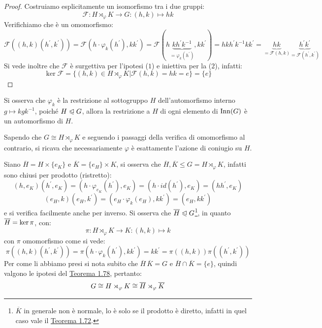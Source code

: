 \documentclass[11pt]{scrartcl}
\begin{document}
\begin{proof}
    Costruiamo esplicitamente un isomorfismo tra i due gruppi:
        \[ \mathcal{F} : H \rtimes_{\varphi} K \longrightarrow G : (h,k) \longmapsto hk
            \]
    Verifichiamo che è un omomorfismo:
        \[
            \mathcal{F}((h,k)(h^{\prime},k^{\prime})) = \mathcal{F}(h\cdot \varphi_k(h^{\prime}),kk^{\prime}) = \mathcal{F}(h\underbrace{kh^{\prime}k^{-1}}_{= \varphi_k(h^{\prime})},kk^{\prime})
            = hkh^{\prime}k^{-1}kk^{\prime} = \underbrace{hk}_{= \mathcal{F}(h,k)}\underbrace{h^{\prime}k^{\prime}}_{= \mathcal{F}(h^{\prime},k^{\prime})}
        \]
    Si vede inoltre che $\mathcal{F}$ è surgettiva per l'ipotesi ($1$) e iniettiva per la ($2$), infatti:
        \[ \ker\mathcal{F} = \{(h,k) \in  H \rtimes_{\varphi} K | \mathcal{F}(h,k) = hk = e\} = \{e\}
            \]
\end{proof}

\begin{remark}
    Si osserva che $\varphi_k$ è la restrizione al sottogruppo $H$ dell'automorfismo interno $g \longmapsto kgk^{-1}$, poiché
    $H \trianglelefteqslant G$, allora la restrizione a $H$ di ogni elemento di $\operatorname{Inn}(G)$ è un automorfismo di $H$.
\end{remark}

\begin{remark}
    Sapendo che $G \cong H \rtimes_{\varphi} K$ e seguendo i passaggi della verifica di omomorfismo al contrario, si ricava che necessariamente $\varphi$ è esattamente
    l'azione di coniugio su $H$.
\end{remark}

\pagebreak

\begin{remark}
    Siano $\overline H = H \times \{e_K\}$ e $\overline K = \{e_H\} \times K$, si osserva che $\overline H, \overline K \leqslant G = H \rtimes_{\varphi} K$, infatti sono chiusi per prodotto (ristretto):
        \[ (h,e_K)(h^{\prime},e_K) = (h \cdot \varphi_{e_K}(h^{\prime}), e_K) = (h \cdot id(h^{\prime}), e_K) = (hh^{\prime},e_K)
        \]\[ (e_H,k)(e_H,k^{\prime}) = (e_H \cdot \varphi_k(e_H), kk^{\prime}) = (e_H,kk^{\prime})
            \]
    e si verifica facilmente anche per inverso. Si osserva che $\overline H \trianglelefteqslant G$\footnote{$\overline K$ in generale non è normale, lo è solo se il prodotto è diretto, infatti in quel caso vale il \hyperref[t:1.72]{Teorema 1.72}.},
    in quanto $\overline H = \ker \pi$, con:
        \[ \pi : H \rtimes_{\varphi} K \longrightarrow K: (h,k) \longmapsto k
            \]
    con $\pi$ omomorfismo come si vede:
        \[ \pi((h,k)(h^{\prime},k^{\prime})) = \pi(h \cdot \varphi_k(h^{\prime}),kk^{\prime}) = kk^{\prime} = \pi((h,k))\pi((h^{\prime},k^{\prime}))
            \]
    Per come li abbiamo presi si nota subito che $\overline H \, \overline K = G$ e $\overline H \cap \overline K = \{e\}$, quindi valgono le ipotesi del \hyperref[t:1.78]{Teorema 1.78}, pertanto:
        \[ G \cong H \rtimes_{\varphi} K \cong \overline H \rtimes_{\varphi} \overline K
            \]
\end{remark}
\end{document}
